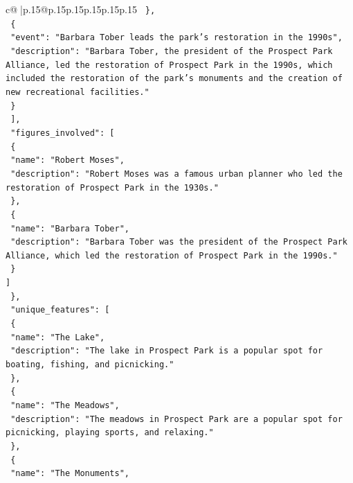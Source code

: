 \documentclass{article}
\begin{document}
{\begin{supertabular}{c@{$\;$}|p{.15\linewidth}@{}p{.15\linewidth}p{.15\linewidth}p{.15\linewidth}p{.15\linewidth}p{.15\linewidth}}
{{{\texttt{        \},} \\
\texttt{        \{} \\
\texttt{          "event": "Barbara Tober leads the park's restoration in the 1990s",} \\
\texttt{          "description": "Barbara Tober, the president of the Prospect Park Alliance, led the restoration of Prospect Park in the 1990s, which included the restoration of the park's monuments and the creation of new recreational facilities."} \\
\texttt{        \}} \\
\texttt{      {]},} \\
\texttt{      "figures\_involved": {[}} \\
\texttt{        \{} \\
\texttt{          "name": "Robert Moses",} \\
\texttt{          "description": "Robert Moses was a famous urban planner who led the restoration of Prospect Park in the 1930s."} \\
\texttt{        \},} \\
\texttt{        \{} \\
\texttt{          "name": "Barbara Tober",} \\
\texttt{          "description": "Barbara Tober was the president of the Prospect Park Alliance, which led the restoration of Prospect Park in the 1990s."} \\
\texttt{        \}} \\
\texttt{      {]}} \\
\texttt{    \},} \\
\texttt{    "unique\_features": {[}} \\
\texttt{      \{} \\
\texttt{        "name": "The Lake",} \\
\texttt{        "description": "The lake in Prospect Park is a popular spot for boating, fishing, and picnicking."} \\
\texttt{      \},} \\
\texttt{      \{} \\
\texttt{        "name": "The Meadows",} \\
\texttt{        "description": "The meadows in Prospect Park are a popular spot for picnicking, playing sports, and relaxing."} \\
\texttt{      \},} \\
\texttt{      \{} \\
\texttt{        "name": "The Monuments",} \\
}}}
\end{supertabular}}
\end{document}
